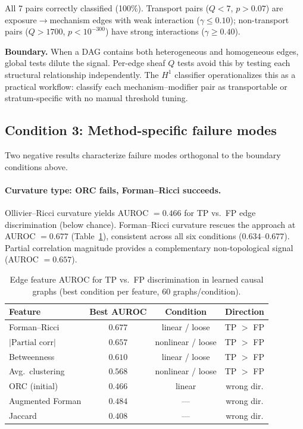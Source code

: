 \documentclass{article}
\begin{document}
All 7 pairs correctly classified (100\%).
Transport pairs ($Q < 7$, $p > 0.07$) are exposure$\to$mechanism edges with weak interaction ($\gamma \leq 0.10$); non-transport pairs ($Q > 1700$, $p < 10^{-300}$) have strong interactions ($\gamma \geq 0.40$).

\textbf{Boundary.} When a DAG contains both heterogeneous and homogeneous edges, global tests dilute the signal.
Per-edge sheaf $Q$ tests avoid this by testing each structural relationship independently.
The $H^1$ classifier operationalizes this as a practical workflow: classify each mechanism--modifier pair as transportable or stratum-specific with no manual threshold tuning.

\subsection{Condition 3: Method-specific failure modes}
\label{sec:res-failures}

Two negative results characterize failure modes orthogonal to the boundary conditions above.

\paragraph{Curvature type: ORC fails, Forman--Ricci succeeds.}
Ollivier--Ricci curvature yields AUROC $= 0.466$ for TP vs.\ FP edge discrimination (below chance).
Forman--Ricci curvature rescues the approach at AUROC $= 0.677$ (Table~\ref{tab:curvature}), consistent across all six conditions ($0.634$--$0.677$).
Partial correlation magnitude provides a complementary non-topological signal (AUROC $= 0.657$).

\begin{table}[t]
\centering
\caption{Edge feature AUROC for TP vs.\ FP discrimination in learned causal graphs (best condition per feature, 60 graphs/condition).}
\label{tab:curvature}
\small
\begin{tabular}{@{}lccc@{}}
\toprule
\textbf{Feature} & \textbf{Best AUROC} & \textbf{Condition} & \textbf{Direction} \\
\midrule
Forman--Ricci & $\mathbf{0.677}$ & linear / loose & TP $>$ FP \\
$|\text{Partial corr}|$ & $0.657$ & nonlinear / loose & TP $>$ FP \\
Betweenness & $0.610$ & linear / loose & TP $>$ FP \\
Avg.\ clustering & $0.568$ & nonlinear / loose & TP $>$ FP \\
\midrule
ORC (initial) & $0.466$ & linear & wrong dir. \\
Augmented Forman & $0.484$ & --- & wrong dir. \\
Jaccard & $0.408$ & --- & wrong dir. \\
\bottomrule
\end{tabular}
\end{table}
\end{document}
